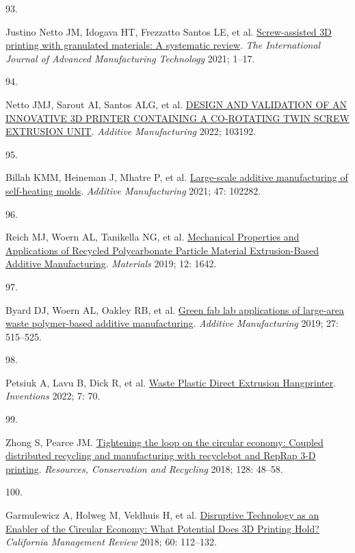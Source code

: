 \documentclass[
  12pt,
  a4paperpaper,
  onecolumn]{article}
\newlength{\cslhangindent}
\newlength{\csllabelwidth}
\newlength{\cslentryspacingunit} %
\newenvironment{CSLReferences}[2] %
 {%
  \setlength{\parindent}{0pt}
  \ifodd #1
  \let\oldpar\par
  \def\par{\hangindent=\cslhangindent\oldpar}
  \fi
  \setlength{\parskip}{#2\cslentryspacingunit}
 }%
 {}
\newcommand{\CSLLeftMargin}[1]{\parbox[t]{\csllabelwidth}{#1}}
\newcommand{\CSLRightInline}[1]{\parbox[t]{\linewidth - \csllabelwidth}{#1}\break}
\begin{document}
\begin{CSLReferences}{0}{0}
\leavevmode{}%
\CSLLeftMargin{93. }%
\CSLRightInline{Justino Netto JM, Idogava HT, Frezzatto Santos LE, et
al. \href{https://doi.org/10.1007/s00170-021-07365-z}{Screw-assisted
{3D} printing with granulated materials: A systematic review}. \emph{The
International Journal of Advanced Manufacturing Technology} 2021;
1--17.}

\leavevmode{}%
\CSLLeftMargin{94. }%
\CSLRightInline{Netto JMJ, Sarout AI, Santos ALG, et al.
\href{https://doi.org/10.1016/j.addma.2022.103192}{{DESIGN AND
VALIDATION OF AN INNOVATIVE 3D PRINTER CONTAINING A CO-ROTATING TWIN
SCREW EXTRUSION UNIT}}. \emph{Additive Manufacturing} 2022; 103192.}

\leavevmode{}%
\CSLLeftMargin{95. }%
\CSLRightInline{Billah KMM, Heineman J, Mhatre P, et al.
\href{https://doi.org/10.1016/J.ADDMA.2021.102282}{Large-scale additive
manufacturing of self-heating molds}. \emph{Additive Manufacturing}
2021; 47: 102282.}

\leavevmode{}%
\CSLLeftMargin{96. }%
\CSLRightInline{Reich MJ, Woern AL, Tanikella NG, et al.
\href{https://doi.org/10.3390/ma12101642}{Mechanical {Properties} and
{Applications} of {Recycled Polycarbonate Particle Material
Extrusion-Based Additive Manufacturing}}. \emph{Materials} 2019; 12:
1642.}

\leavevmode{}%
\CSLLeftMargin{97. }%
\CSLRightInline{Byard DJ, Woern AL, Oakley RB, et al.
\href{https://doi.org/10.1016/j.addma.2019.03.006}{Green fab lab
applications of large-area waste polymer-based additive manufacturing}.
\emph{Additive Manufacturing} 2019; 27: 515--525.}

\leavevmode{}%
\CSLLeftMargin{98. }%
\CSLRightInline{Petsiuk A, Lavu B, Dick R, et al.
\href{https://doi.org/10.3390/inventions7030070}{Waste {Plastic Direct
Extrusion Hangprinter}}. \emph{Inventions} 2022; 7: 70.}

\leavevmode{}%
\CSLLeftMargin{99. }%
\CSLRightInline{Zhong S, Pearce JM.
\href{https://doi.org/10.1016/j.resconrec.2017.09.023}{Tightening the
loop on the circular economy: {Coupled} distributed recycling and
manufacturing with recyclebot and {RepRap} 3-{D} printing}.
\emph{Resources, Conservation and Recycling} 2018; 128: 48--58.}

\leavevmode{}%
\CSLLeftMargin{100. }%
\CSLRightInline{Garmulewicz A, Holweg M, Veldhuis H, et al.
\href{https://doi.org/10.1177/0008125617752695}{Disruptive {Technology}
as an {Enabler} of the {Circular Economy}: {What Potential Does 3D
Printing Hold}?} \emph{California Management Review} 2018; 60:
112--132.}


\end{CSLReferences}
\end{document}
